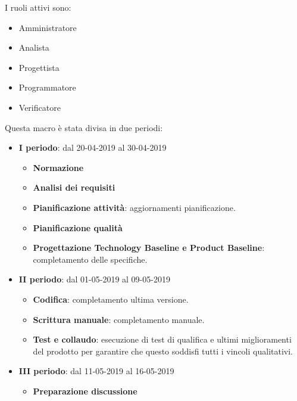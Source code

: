         I ruoli attivi sono: 
        \begin{itemize}
            \item Amministratore
            \item Analista
            \item Progettista
            \item Programmatore
            \item Verificatore
        \end{itemize}
        Questa macro è stata divisa in due periodi:
		\begin{itemize}
			\item \textbf{I periodo}: dal 20-04-2019 al 30-04-2019
			\begin{itemize}
    	        \item \textbf{Normazione}
    	        \item \textbf{Analisi dei requisiti}
    	        \item \textbf{Pianificazione attività}: aggiornamenti pianificazione.
    	        \item \textbf{Pianificazione qualità}
    	        \item \textbf{Progettazione Technology Baseline e Product Baseline}: completamento delle specifiche.
        	\end{itemize}
			\item \textbf{II periodo}: dal 01-05-2019 al 09-05-2019
			\begin{itemize}
    	        \item \textbf{Codifica}: completamento ultima versione.
    	        \item \textbf{Scrittura manuale}: completamento manuale.
    	        \item \textbf{Test e collaudo}: esecuzione di test di qualifica e ultimi miglioramenti del prodotto per
    	        garantire che questo soddisfi tutti i vincoli qualitativi.
			\end{itemize}
			\item \textbf{III periodo}: dal 11-05-2019 al 16-05-2019
			\begin{itemize}
				\item \textbf{Preparazione discussione}
			\end{itemize}
		\end{itemize}


